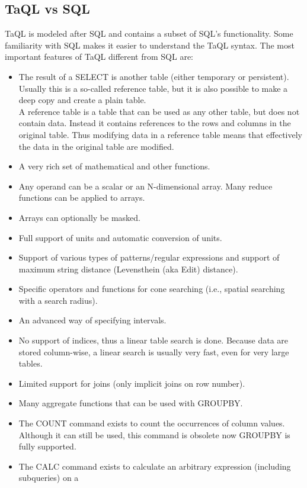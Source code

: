 \subsection{TaQL vs SQL}
TaQL is modeled after SQL and contains a subset of SQL's
functionality. Some familiarity with SQL makes it easier to understand
the TaQL syntax.
The most important features of TaQL different from SQL are:
\begin{itemize}
\item The result of a SELECT is another table (either temporary or
persistent). Usually this
is a so-called reference table, but it is also possible to make a deep
copy and create a plain table.
\\A reference table is a table that can be used as any other table,
but does not contain data. Instead it contains references to the
rows and columns in the original table. Thus modifying data in a
reference table means that effectively the data in the original
table are modified.
\item A very rich set of mathematical and other functions.
\item Any operand can be a scalar or an N-dimensional array.
Many reduce functions can be applied to arrays.
\item Arrays can optionally be masked.
\item Full support of units and automatic conversion of units.
\item Support of various types of patterns/regular expressions and
support of maximum string distance (Levensthein (aka Edit) distance).
\item Specific operators and functions for cone searching
(i.e., spatial searching with a search radius).
\item An advanced way of specifying intervals.
\item No support of indices, thus a linear table search is done.
Because data are stored column-wise, a linear search is usually very
 fast, even for very large tables.
\item Limited support for joins (only implicit joins on row number).
\item Many aggregate functions that can be used with GROUPBY.
\item The COUNT command exists to count the occurrences of column
  values. Although it can still be used, this command is obsolete now 
  GROUPBY is fully supported.
\item The CALC command exists to
calculate an arbitrary expression (including subqueries) on a

\end{itemize}
